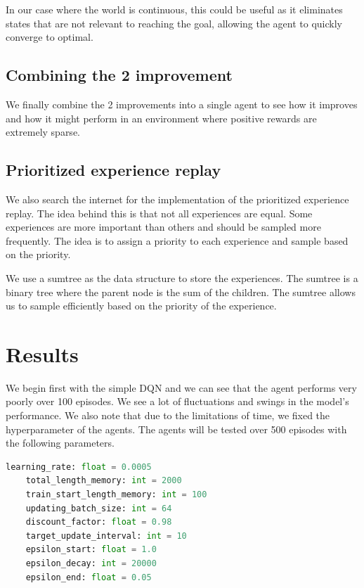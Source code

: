 \documentclass{article}
\begin{document}
In our case where the world is continuous, this could be useful as it eliminates
states that are not relevant to reaching the goal, allowing the agent to quickly
converge to optimal.

\subsection*{Combining the 2 improvement}

We finally combine the 2 improvements into a single agent to see how it improves
and how it might perform in an environment where positive rewards are extremely
sparse.

\subsection*{Prioritized experience replay}

We also search the internet for the implementation of the prioritized experience
replay. The idea behind this is that not all experiences are equal. Some experiences
are more important than others and should be sampled more frequently. The idea
is to assign a priority to each experience and sample based on the priority.

We use a sumtree as the data structure to store the experiences. The sumtree is
a binary tree where the parent node is the sum of the children. The sumtree allows
us to sample efficiently based on the priority of the experience.

\section*{Results}

We begin first with the simple DQN and we can see that the agent performs very
poorly over 100 episodes. We see a lot of fluctuations and swings in the model's
performance. We also note that due to the limitations of time, we fixed the
hyperparameter of the agents. The agents will be tested over 500 episodes with the
following parameters.

\begin{lstlisting}[language=python]
    learning_rate: float = 0.0005
    total_length_memory: int = 2000
    train_start_length_memory: int = 100
    updating_batch_size: int = 64
    discount_factor: float = 0.98
    target_update_interval: int = 10
    epsilon_start: float = 1.0
    epsilon_decay: int = 20000
    epsilon_end: float = 0.05
\end{lstlisting}
\end{document}
